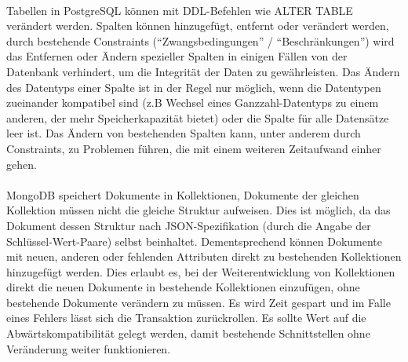 \paragraph{}
Tabellen in PostgreSQL können mit DDL-Befehlen wie ALTER TABLE verändert werden. \cite{db:postgresAlterTable}
Spalten können hinzugefügt, entfernt oder verändert werden, durch bestehende Constraints (\enquote{Zwangsbedingungen} / \enquote{Beschränkungen}) wird das Entfernen oder Ändern spezieller Spalten in einigen Fällen von der Datenbank verhindert, um die Integrität der Daten zu gewährleisten. 
Das Ändern des Datentyps einer Spalte ist in der Regel nur möglich, wenn die Datentypen zueinander kompatibel sind (z.B Wechsel eines Ganzzahl-Datentyps zu einem anderen, der mehr Speicherkapazität bietet) oder die Spalte für alle Datensätze leer ist.
Das Ändern von bestehenden Spalten kann, unter anderem durch Constraints, zu Problemen führen, die mit einem weiteren Zeitaufwand einher gehen.

\paragraph{}
MongoDB speichert Dokumente in Kollektionen, Dokumente der gleichen Kollektion müssen nicht die gleiche Struktur aufweisen. \cite{db:mongoCollection}
Dies ist möglich, da das Dokument dessen Struktur nach JSON-Spezifikation (durch die Angabe der Schlüssel-Wert-Paare) selbst beinhaltet.
Dem\-entsprechend können Dokumente mit neuen, anderen oder fehlenden Attributen direkt zu bestehenden Kollektionen hinzugefügt werden.
Dies erlaubt es, bei der Weiterentwicklung von Kollektionen direkt die neuen Dokumente in bestehende Kollektionen einzufügen, ohne bestehende Dokumente verändern zu müssen.
Es wird Zeit gespart und im Falle eines Fehlers lässt sich die Transaktion zurückrollen.
Es sollte Wert auf die Abwärtskompatibilität gelegt werden, damit bestehende Schnittstellen ohne Veränderung weiter funktionieren.

